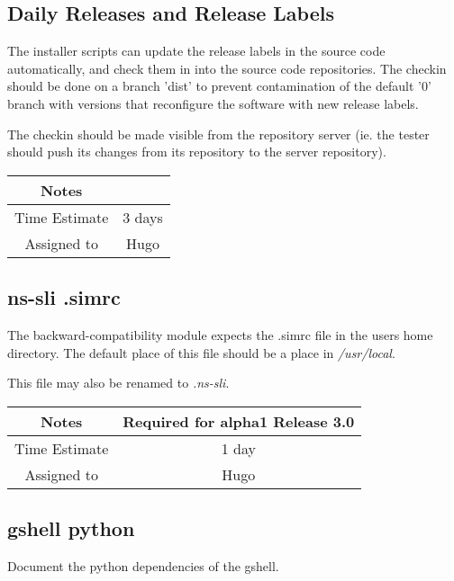 \documentclass[12pt]{article}
\begin{document}
\subsection{Daily Releases and Release Labels}

The installer scripts can update the release labels in the source code
automatically, and check them in into the source code repositories.
The checkin should be done on a branch 'dist' to prevent contamination
of the default '0' branch with versions that reconfigure the software
with new release labels.

The checkin should be made visible from the repository server (ie. the
tester should push its changes from its repository to the server
repository).

{
  \vspace{5mm}
  \centering
  \begin{tabular}{|c|c|}
    \hline
    Notes
    & \\
    \hline
    Time Estimate
    & 3 days \\
    \hline
    Assigned to
    & Hugo \\
    \hline
  \end{tabular}
}


\subsection{ns-sli .simrc}

The backward-compatibility module expects the .simrc file in the users
home directory.  The default place of this file should be a place in
{\it /usr/local}.

This file may also be renamed to {\it .ns-sli}.

{
  \vspace{5mm}
  \centering
  \begin{tabular}{|c|c|}
    \hline
    Notes
    & Required for alpha1 Release 3.0 \\
    \hline
    Time Estimate
    & 1 day \\
    \hline
    Assigned to
    & Hugo \\
    \hline
  \end{tabular}
}


\subsection{gshell python}

Document the python dependencies of the gshell.
\end{document}
